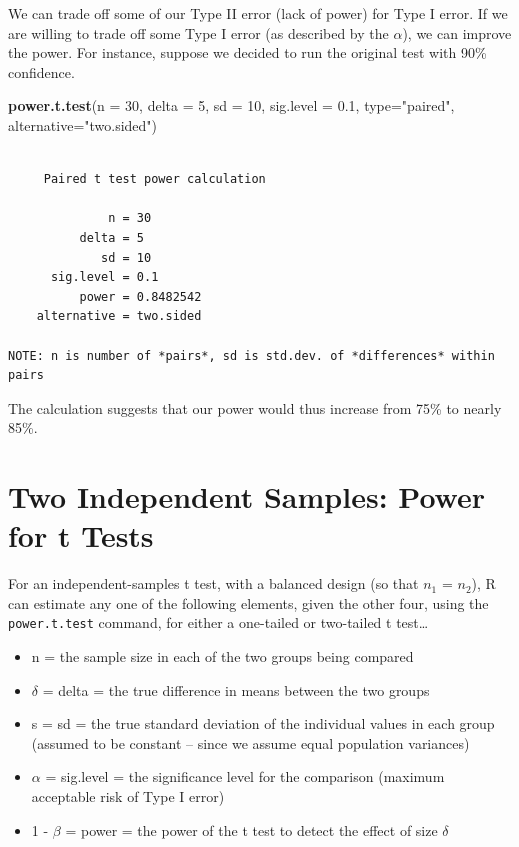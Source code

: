 \documentclass[
]{book}
\newenvironment{Shaded}{\begin{snugshade}}{\end{snugshade}}
\newcommand{\DataTypeTok}[1]{\textcolor[rgb]{0.13,0.29,0.53}{#1}}
\newcommand{\DecValTok}[1]{\textcolor[rgb]{0.00,0.00,0.81}{#1}}
\newcommand{\FloatTok}[1]{\textcolor[rgb]{0.00,0.00,0.81}{#1}}
\newcommand{\KeywordTok}[1]{\textcolor[rgb]{0.13,0.29,0.53}{\textbf{#1}}}
\newcommand{\NormalTok}[1]{#1}
\newcommand{\StringTok}[1]{\textcolor[rgb]{0.31,0.60,0.02}{#1}}
\providecommand{\tightlist}{%
  \setlength{\itemsep}{0pt}\setlength{\parskip}{0pt}}
\begin{document}
We can trade off some of our Type II error (lack of power) for Type I error. If we are willing to trade off some Type I error (as described by the \(\alpha\)), we can improve the power. For instance, suppose we decided to run the original test with 90\% confidence.

\begin{Shaded}
\begin{Highlighting}[]
\KeywordTok{power.t.test}\NormalTok{(}\DataTypeTok{n =} \DecValTok{30}\NormalTok{, }\DataTypeTok{delta =} \DecValTok{5}\NormalTok{, }\DataTypeTok{sd =} \DecValTok{10}\NormalTok{, }\DataTypeTok{sig.level =} \FloatTok{0.1}\NormalTok{, }
             \DataTypeTok{type=}\StringTok{"paired"}\NormalTok{, }\DataTypeTok{alternative=}\StringTok{"two.sided"}\NormalTok{)}
\end{Highlighting}
\end{Shaded}

\begin{verbatim}

     Paired t test power calculation 

              n = 30
          delta = 5
             sd = 10
      sig.level = 0.1
          power = 0.8482542
    alternative = two.sided

NOTE: n is number of *pairs*, sd is std.dev. of *differences* within pairs
\end{verbatim}

The calculation suggests that our power would thus increase from 75\% to nearly 85\%.

\hypertarget{two-independent-samples-power-for-t-tests}{%
\section{Two Independent Samples: Power for t Tests}\label{two-independent-samples-power-for-t-tests}}

For an independent-samples t test, with a balanced design (so that \(n_1\) = \(n_2\)), R can estimate any one of the following elements, given the other four, using the \texttt{power.t.test} command, for either a one-tailed or two-tailed t test\ldots{}

\begin{itemize}
\tightlist
\item
  n = the sample size in each of the two groups being compared
\item
  \(\delta\) = delta = the true difference in means between the two groups
\item
  s = sd = the true standard deviation of the individual values in each group (assumed to be constant -- since we assume equal population variances)
\item
  \(\alpha\) = sig.level = the significance level for the comparison (maximum acceptable risk of Type I error)
\item
  1 - \(\beta\) = power = the power of the t test to detect the effect of size \(\delta\)
\end{itemize}
\end{document}
